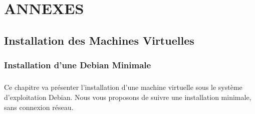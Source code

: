 \chapter{\textbf{\Large ANNEXES}}

\newpage

\section{Installation des Machines Virtuelles}

\subsection{Installation d'une Debian Minimale}
\paragraph{}
Ce chapitre va présenter l'installation d'une machine virtuelle sous le système d'exploitation Debian. Nous vous proposons de suivre une installation minimale, sans connexion réseau.


